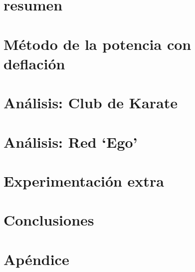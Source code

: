 \documentclass{packages/homework}
\begin{document}
 



\section*{resumen}

\vspace{2em}

\tableofcontents
\newpage

\section{Método de la potencia con deflación}

\newpage

\section{Análisis: Club de Karate}

\newpage

\section{Análisis: Red `Ego'}

\newpage

\section{Experimentación extra}

\newpage

\section{Conclusiones}

\newpage

\section{Apéndice}

\newpage


\end{document}
